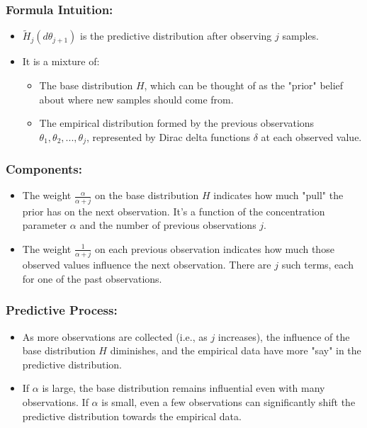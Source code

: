\documentclass[10pt]{article}
\begin{document}
\subsubsection*{Formula Intuition:}
\begin{itemize}
  \item \( \tilde{H}_j(d\theta_{j+1}) \) is the predictive distribution after observing \( j \) samples.
  \item It is a mixture of:
  \begin{itemize}
    \item The base distribution \( H \), which can be thought of as the "prior" belief about where new samples should come from.
    \item The empirical distribution formed by the previous observations \( \theta_1, \theta_2, ..., \theta_j \), represented by Dirac delta functions \( \delta \) at each observed value.
  \end{itemize}
\end{itemize}

\subsubsection*{Components:}
\begin{itemize}
  \item The weight \( \frac{\alpha}{\alpha + j} \) on the base distribution \( H \) indicates how much "pull" the prior has on the next observation. It's a function of the concentration parameter \( \alpha \) and the number of previous observations \( j \).
  \item The weight \( \frac{1}{\alpha + j} \) on each previous observation indicates how much those observed values influence the next observation. There are \( j \) such terms, each for one of the past observations.
\end{itemize}

\subsubsection*{Predictive Process:}
\begin{itemize}
  \item As more observations are collected (i.e., as \( j \) increases), the influence of the base distribution \( H \) diminishes, and the empirical data have more "say" in the predictive distribution.
  \item If \( \alpha \) is large, the base distribution remains influential even with many observations. If \( \alpha \) is small, even a few observations can significantly shift the predictive distribution towards the empirical data.
\end{itemize}
\end{document}
